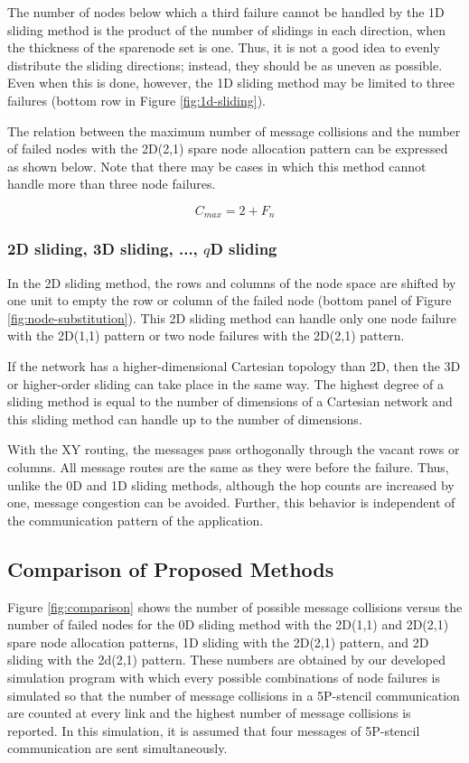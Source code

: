 \documentclass[Afour,times,sageh]{sagej}
\begin{document}
The number of nodes below which a third failure cannot be handled by
the 1D sliding method is the product of the number of slidings in each
direction, when the thickness of the sparenode set is one. Thus, it is
not a good idea to evenly distribute the
sliding directions; instead, they should be as uneven as possible.
Even when this is done, however, the 1D sliding method may be limited
to three failures (bottom row in Figure \ref{fig:1d-sliding}).

The relation between the maximum number of message collisions and the
number of failed nodes with the 2D(2,1) spare node allocation pattern
can be expressed as shown below. Note that there may be cases in which
this method cannot handle more than three node failures.

\[
C_{max} = 2 + F_n
\]

\subsubsection{2D sliding, 3D sliding, ..., $q$D sliding}

In the 2D sliding method, the rows and columns of the node space are
shifted by one unit to empty the row or column of the failed node
(bottom panel of Figure \ref{fig:node-substitution}). This 2D sliding
method can handle only one node failure with the 2D(1,1) pattern or
two node failures with the 2D(2,1) pattern.

If the network has a
higher-dimensional Cartesian topology than 2D, then the 3D or
higher-order sliding can take place in the same way. The highest
degree of a sliding method is equal to the number of dimensions of a
Cartesian network and this sliding method can handle up to the number
of dimensions.

With the XY routing, the messages pass orthogonally through the vacant
rows or columns. All message routes are the same as they were before
the failure. Thus, unlike the 0D and 1D sliding methods, although the
hop counts are increased by one, message congestion can be
avoided. Further, this behavior is independent of the communication
pattern of the application.

\subsection{Comparison of Proposed Methods}\label{sec:comparison}

Figure \ref{fig:comparison} shows the number of possible message
collisions versus the number of failed nodes for the 0D sliding method
with the 2D(1,1) and 2D(2,1) spare node allocation patterns, 1D
sliding with the 2D(2,1) pattern, and 2D sliding with the 2d(2,1)
pattern. These numbers are obtained by our developed simulation
program with which every possible combinations of node failures is
simulated so that the number of message collisions in a 5P-stencil
communication are counted at every link and the highest number of
message collisions is reported. In this simulation, it is assumed that
four messages of 5P-stencil communication are sent simultaneously.
\end{document}
